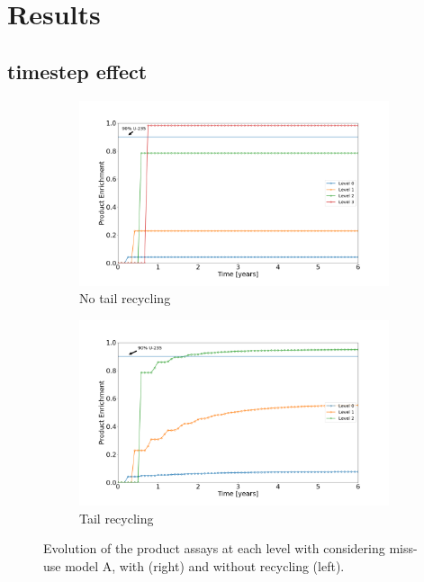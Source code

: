 \section{Results}
\subsection{timestep effect}

\begin{figure}[t!]
    \centering
    \begin{subfigure}[t]{0.45\textwidth}
        \centering
        \includegraphics[scale=0.18]{NR_case1}
        \caption{No tail recycling}
    \end{subfigure}%
    \begin{subfigure}[t]{0.45\textwidth}
        \centering
        \includegraphics[scale=0.18]{R_case1}
        \caption{Tail recycling}
    \end{subfigure}
    \caption{Evolution of the product assays at each level with considering
    miss-use model A, with (right) and without recycling (left).}
\end{figure}
